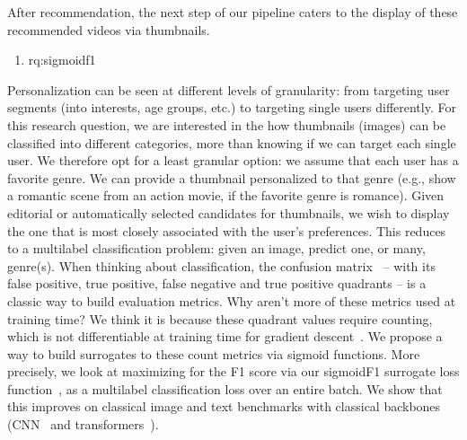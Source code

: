 After recommendation, the next step of our pipeline caters to the display of these recommended videos via thumbnails.
%
%
\begin{enumerate}[label=\textbf{RQ\arabic*},ref={RQ\arabic*},resume,leftmargin=*]
	\item \acl{rq:sigmoidf1}\label{rq:sigmoidf1}
\end{enumerate}
%
Personalization can be seen at different levels of granularity: from targeting user segments (into interests, age groups, etc.) to targeting single users differently. For this research question, we are interested in the how thumbnails (images) can be classified into different categories, more than knowing if we can target each single user. We therefore opt for a least granular option: we assume that each user has a favorite genre. We can provide a thumbnail personalized to that genre (e.g., show a romantic scene from an action movie, if the favorite genre is romance). Given editorial or automatically selected candidates for thumbnails, we wish to display the one that is most closely associated with the user's preferences. This reduces to a multilabel classification problem: given an image, predict one, or many, genre(s). When thinking about classification, the confusion matrix~\cite{confusionMatrix} – with its false positive, true positive, false negative and true positive quadrants – is a classic way to build evaluation metrics. Why aren't more of these metrics used at training time? We think it is because these quadrant values require counting, which is not differentiable at training time for gradient descent~\cite{sgd1, sgd2}. We propose a way to build surrogates to these count metrics via sigmoid functions. More precisely, we look at maximizing for the F1 score via our sigmoidF1 surrogate loss function~\cite{sigmoidf1}, as a multilabel classification loss over an entire batch. We show that this improves on classical image and text benchmarks with classical backbones (CNN~\cite{cnn} and transformers~\cite{attention}).

